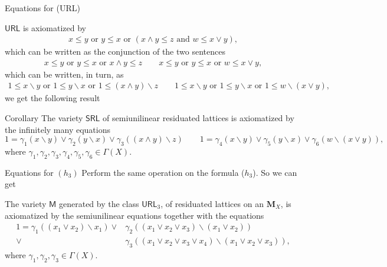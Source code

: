 \documentclass[professionalfont, 10pt]{beamer} %
\theoremstyle{plain}
\theoremstyle{definition}
\begin{document}
\begin{frame}{Equations for (URL)}

$\mathsf{URL}$ is axiomatized by
\begin{align*}
    x \leq y \text{ or } y \leq x \text{ or } (x \wedge y \leq z \text{ and } w \leq x \vee y ),
\end{align*}
\pause
which can be written as the conjunction of the two sentences
\begin{align*}
    x \leq y \text{ or } y \leq x \text{ or } x \wedge y \leq z \qquad
        x \leq y \text{ or } y \leq x \text{ or }w \leq x \vee y,
\end{align*}
\pause
which can be written, in turn, as
\begin{align*}
    1 \leq x \backslash y \text{ or } 1 \leq y \backslash x \text{ or } 1 \leq (x \wedge y) \backslash z \qquad
    1 \leq x \backslash y \text{ or } 1 \leq y \backslash x \text{ or }  1 \leq w \backslash (x \vee y),
\end{align*}
\pause
we get the following result
\begin{block}{Corollary}
    The variety $\mathsf{SRL}$ of semiunilinear residuated lattices is axiomatized by the infinitely many equations 
    $$1 = \gamma_1(x \backslash y) \vee \gamma_2(y \backslash x) \vee \gamma_3 ((x \wedge y) \backslash z) \qquad 1 = \gamma_4(x \backslash y) \vee \gamma_5(y \backslash x) \vee \gamma_6 (w \backslash (x \vee y)),$$
    where $ \gamma_1, \gamma_2, \gamma_3, \gamma_4, \gamma_5, \gamma_6 \in \Gamma(X)$. 
\end{block}
\end{frame}

\begin{frame}{Equations for $(h_3)$}
Perform the same operation on the formula ($h_3$). \pause
So we can get
\begin{block}{}
    The variety $\mathsf{M}$ generated by the class $\mathsf{URL}_3$, of residuated lattices on an $\mathbf{M}_X$, is axiomatized by the semiunilinear equations together with the equations 
    \begin{align*}
        1 = \gamma_1((x_1 \vee x_2)\backslash x_1) \vee & \gamma_2((x_1 \vee x_2 \vee x_3)\backslash (x_1 \vee x_2))\\
        \vee & \gamma_3((x_1 \vee x_2 \vee x_3 \vee x_4) \backslash (x_1 \vee x_2 \vee x_3)),
    \end{align*}
    where $\gamma_1, \gamma_2, \gamma_3 \in \Gamma(X)$.
\end{block}

\end{frame}
\end{document}

